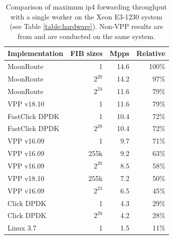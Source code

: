\begin{table}[!ht]
	\vspace{5ex}
	\begin{tabular}[]{ l r r r }
		Implementation	 & FIB sizes & Mpps		& Relative \\ 
		\midrule
		MoonRoute		 & 1		 & 14.6		& 100\% \\
		MoonRoute		 & $2^{20}$	 & 14.2		& 97\% \\
		MoonRoute		 & $2^{24}$	 & 11.6		& 79\% \\
		VPP v18.10		 & 1		 & 11.6		& 79\% \\
		FastClick DPDK	 & 1		 & 10.4 	& 72\% \\
		FastClick DPDK	 & $2^{20}$	 & 10.4 	& 72\% \\
		VPP v16.09		 & 1		 & 9.7	 	& 71\% \\
		VPP v16.09		 & 255k		 & 9.2	 	& 63\% \\
		VPP v16.09		 & $2^{20}$	 & 8.5	 	& 58\% \\
		VPP v18.10		 & 255k		 & 7.2	 	& 50\% \\
		VPP v16.09		 & $2^{23}$	 & 6.5	 	& 45\% \\
		Click DPDK		 & 1		 & 4.3 		& 29\% \\
		Click DPDK		 & $2^{20}$	 & 4.2 		& 28\% \\
		Linux 3.7		 & 1		 & 1.5 		& 11\% \\

		\midrule
	\end{tabular}
	\caption{Comparison of maximum \Ac{ip4} forwarding throughput with a single worker on the Xeon E3-1230 system (see Table \ref{table:hardware}). Non-VPP results are from \cite{chair:architecture} and are conducted on the same system. }
	\label{table:comparison}
\end{table}



